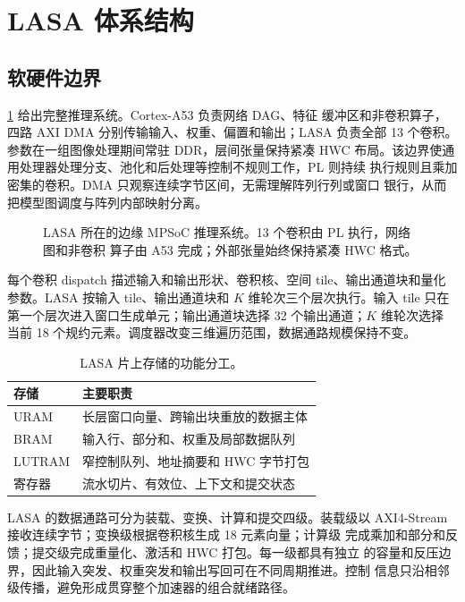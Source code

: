\section{LASA 体系结构}
\label{sec:architecture}

\subsection{软硬件边界}

\cref{fig:system-placeholder} 给出完整推理系统。Cortex-A53 负责网络 DAG、特征
缓冲区和非卷积算子，四路 AXI DMA 分别传输输入、权重、偏置和输出；LASA
负责全部 13 个卷积。参数在一组图像处理期间常驻 DDR，层间张量保持紧凑 HWC
布局。该边界使通用处理器处理分支、池化和后处理等控制不规则工作，PL 则持续
执行规则且乘加密集的卷积。DMA 只观察连续字节区间，无需理解阵列行列或窗口
银行，从而把模型图调度与阵列内部映射分离。

\begin{figure}[t]
\centering
{}
\caption{LASA 所在的边缘 MPSoC 推理系统。13 个卷积由 PL 执行，网络图和非卷积
算子由 A53 完成；外部张量始终保持紧凑 HWC 格式。}
\label{fig:system-placeholder}
\end{figure}

每个卷积 dispatch 描述输入和输出形状、卷积核、空间 tile、输出通道块和量化
参数。LASA 按输入 tile、输出通道块和 $K$ 维轮次三个层次执行。输入 tile 只在
第一个层次进入窗口生成单元；输出通道块选择 32 个输出通道；$K$ 维轮次选择
当前 18 个规约元素。调度器改变三维遍历范围，数据通路规模保持不变。

\begin{table}[t]
\centering
\caption{LASA 片上存储的功能分工。}
\label{tab:memory-role}
\small
\begin{tabular}{lp{42mm}}
\toprule
存储 & 主要职责 \\
\midrule
URAM & 长层窗口向量、跨输出块重放的数据主体 \\
BRAM & 输入行、部分和、权重及局部数据队列 \\
LUTRAM & 窄控制队列、地址摘要和 HWC 字节打包 \\
寄存器 & 流水切片、有效位、上下文和提交状态 \\
\bottomrule
\end{tabular}
\end{table}

LASA 的数据通路可分为装载、变换、计算和提交四级。装载级以 AXI4-Stream
接收连续字节\cite{axi4stream}；变换级根据卷积核生成 18 元素向量；计算级
完成乘加和部分和反馈；提交级完成重量化、激活和 HWC 打包。每一级都具有独立
的容量和反压边界，因此输入突发、权重突发和输出写回可在不同周期推进。控制
信息只沿相邻级传播，避免形成贯穿整个加速器的组合就绪路径。


